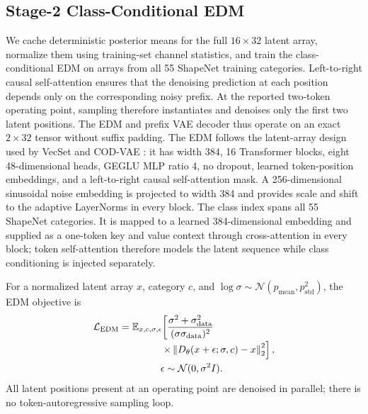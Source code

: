 \subsection{Stage-2 Class-Conditional EDM}

We cache deterministic posterior means for the full $16\times32$ latent array,
normalize them using training-set channel statistics, and train the
class-conditional EDM on arrays from all 55 ShapeNet training categories.
Left-to-right causal self-attention ensures that the denoising prediction at
each position depends only on the corresponding noisy prefix. At the reported
two-token operating point, sampling therefore instantiates and denoises only
the first two latent positions. The EDM and prefix VAE decoder thus operate on
an exact $2\times32$ tensor without suffix padding.
The EDM follows the latent-array design used by
VecSet and COD-VAE \citep{zhang20233dshape2vecset,cho2025representing}: it has
width 384, 16 Transformer blocks, eight 48-dimensional heads, GEGLU MLP ratio
4, no dropout, learned token-position embeddings, and a left-to-right causal
self-attention mask. A
256-dimensional sinusoidal noise embedding is projected to width 384 and
provides scale and shift to the adaptive LayerNorms in every block.  The class
index spans all 55 ShapeNet categories. It is mapped to a learned
384-dimensional embedding and supplied as a one-token key and value context
through cross-attention in every block; token self-attention therefore models
the latent sequence while class conditioning is injected separately.

For a normalized latent array $x$, category $c$, and
$\log\sigma\sim\mathcal{N}(p_{\mathrm{mean}},p_{\mathrm{std}}^2)$, the EDM
objective is
\begin{equation}
\begin{aligned}
\mathcal{L}_{\mathrm{EDM}}
&=\mathbb{E}_{x,c,\sigma,\epsilon}\!\left[
\frac{\sigma^2+\sigma_{\mathrm{data}}^2}
{(\sigma\sigma_{\mathrm{data}})^2}
\right.\\[-0.2em]
&\hspace{4.2em}\left.
\times\left\|D_{\theta}(x+\epsilon;\sigma,c)-x\right\|_2^2
\right],
\\
&\hspace{4.2em}
\epsilon\sim\mathcal{N}(0,\sigma^2I).
\end{aligned}
\end{equation}
All latent positions present at an operating point are denoised in parallel;
there is no token-autoregressive sampling loop.

